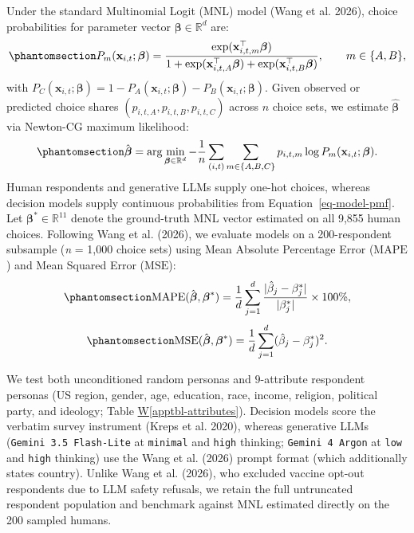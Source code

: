 \documentclass[
  11pt,
  letterpaper,
]{article}
\newcommand*\quartoapptblref[1]{Table \hyperref[#1]{W\ref{#1}}}
\begin{document}
Under the standard Multinomial Logit (MNL) model (Wang et al. 2026),
choice probabilities for parameter vector
\(\boldsymbol{\beta} \in \mathbb{R}^d\) are:
\begin{equation}\protect\phantomsection\label{eq-mnl-probs}{
P_m(\mathbf{x}_{i,t}; \boldsymbol{\beta}) = \frac{\exp(\mathbf{x}_{i,t,m}^\top \boldsymbol{\beta})}{1 + \exp(\mathbf{x}_{i,t,A}^\top \boldsymbol{\beta}) + \exp(\mathbf{x}_{i,t,B}^\top \boldsymbol{\beta})}, \qquad m \in \{A, B\},
}\end{equation} with
\(P_C(\mathbf{x}_{i,t}; \boldsymbol{\beta}) = 1 - P_A(\mathbf{x}_{i,t}; \boldsymbol{\beta}) - P_B(\mathbf{x}_{i,t}; \boldsymbol{\beta})\).
Given observed or predicted choice shares
\((p_{i,t,A}, p_{i,t,B}, p_{i,t,C})\) across \(n\) choice sets, we
estimate \(\hat{\boldsymbol{\beta}}\) via Newton-CG maximum likelihood:
\begin{equation}\protect\phantomsection\label{eq-mnl-mle}{
\hat{\boldsymbol{\beta}} = \arg\min_{\boldsymbol{\beta} \in \mathbb{R}^d} -\frac{1}{n} \sum_{(i,t)} \sum_{m \in \{A, B, C\}} p_{i,t,m} \log P_m(\mathbf{x}_{i,t}; \boldsymbol{\beta}).
}\end{equation} Human respondents and generative LLMs supply one-hot
choices, whereas decision models supply continuous probabilities from
Equation~\ref{eq-model-pmf}. Let
\(\boldsymbol{\beta}^* \in \mathbb{R}^{11}\) denote the ground-truth MNL
vector estimated on all 9,855 human choices. Following Wang et al.
(2026), we evaluate models on a 200-respondent subsample (\emph{n} =
1,000 choice sets) using Mean Absolute Percentage Error
(\(\mathrm{MAPE}\)) and Mean Squared Error (\(\mathrm{MSE}\)):
\begin{equation}\protect\phantomsection\label{eq-wang-mape}{
\mathrm{MAPE}(\hat{\boldsymbol{\beta}}, \boldsymbol{\beta}^*) = \frac{1}{d} \sum_{j=1}^{d} \frac{|\hat{\beta}_j - \beta^*_j|}{|\beta^*_j|} \times 100\%,
}\end{equation}
\begin{equation}\protect\phantomsection\label{eq-wang-mse}{
\mathrm{MSE}(\hat{\boldsymbol{\beta}}, \boldsymbol{\beta}^*) = \frac{1}{d} \sum_{j=1}^{d} (\hat{\beta}_j - \beta^*_j)^2.
}\end{equation}

We test both unconditioned random personas and \(9\)-attribute
respondent personas (US region, gender, age, education, race, income,
religion, political party, and ideology;
\quartoapptblref{apptbl-attributes}). Decision models score the verbatim
survey instrument (Kreps et al. 2020), whereas generative LLMs
(\texttt{Gemini\ 3.5\ Flash-Lite} at \texttt{minimal} and \texttt{high}
thinking; \texttt{Gemini\ 4\ Argon} at \texttt{low} and \texttt{high}
thinking) use the Wang et al. (2026) prompt format (which additionally
states country). Unlike Wang et al. (2026), who excluded vaccine opt-out
respondents due to LLM safety refusals, we retain the full untruncated
respondent population and benchmark against MNL estimated directly on
the 200 sampled humans.
\end{document}
